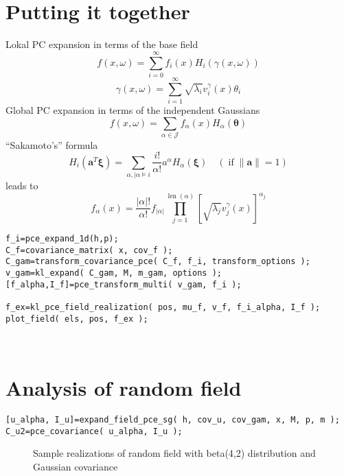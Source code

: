 \documentclass{article}
\newcommand{\tmmathbf}[1]{\ensuremath{\boldsymbol{#1}}}
\newcommand{\tmop}[1]{\ensuremath{\operatorname{#1}}}
\begin{document}
{\newpage}

\section{Putting it together}

Lokal PC expansion in terms of the base field
\[ f (x, \omega) = \sum_{i = 0}^{\infty} f_i (x) H_i (\gamma (x, \omega))
   \label{eq:saka-expand-uU} \]
\[ \gamma (x, \omega) = \sum_{i = 1}^{\infty} \sqrt{\lambda_i} v^{\gamma}_i
   (x) \theta_i \]
Global PC expansion in terms of the independent Gaussians
\[ f (x, \omega) = \sum_{\alpha \in \mathcal{J}} f_{\alpha} (x) H_{\alpha} (
   \tmmathbf{\theta}) \label{eq:saka-expand-uu} \]
``Sakamoto's'' formula
\[ H_i ( \tmmathbf{a}^T \tmmathbf{\xi}) = \sum_{\alpha, | \alpha \vDash i}
   \frac{i!}{\alpha !} a^{\alpha} H_{\alpha} ( \tmmathbf{\xi}) \hspace{1em}
   (\tmop{if} \| \tmmathbf{a} \|= 1) \]
leads to
\[ f_{\alpha} (x) = \frac{| \alpha |!}{\alpha !} f_{| \alpha |}
   \prod^{\tmop{len} (\alpha)}_{j = 1^{}} \left[ \sqrt{\lambda_j} v^{\gamma}_j
   (x) \right]^{\alpha_j} \]
{\pagebreak}
\begin{verbatim}
f_i=pce_expand_1d(h,p);
C_f=covariance_matrix( x, cov_f );
C_gam=transform_covariance_pce( C_f, f_i, transform_options );
v_gam=kl_expand( C_gam, M, m_gam, options );
[f_alpha,I_f]=pce_transform_multi( v_gam, f_i );

f_ex=kl_pce_field_realization( pos, mu_f, v_f, f_i_alpha, I_f );
plot_field( els, pos, f_ex );
\end{verbatim}
\begin{figure}[h]
  \caption{}
\end{figure}

\\
\section{Analysis of random field}
\begin{verbatim}
[u_alpha, I_u]=expand_field_pce_sg( h, cov_u, cov_gam, x, M, p, m ); C_u2=pce_covariance( u_alpha, I_u );
\end{verbatim}
\begin{figure}[h]
  \caption{Sample realizations of random field with beta(4,2) distribution and
  Gaussian covariance}
\end{figure}

{\newpage}
\end{document}
